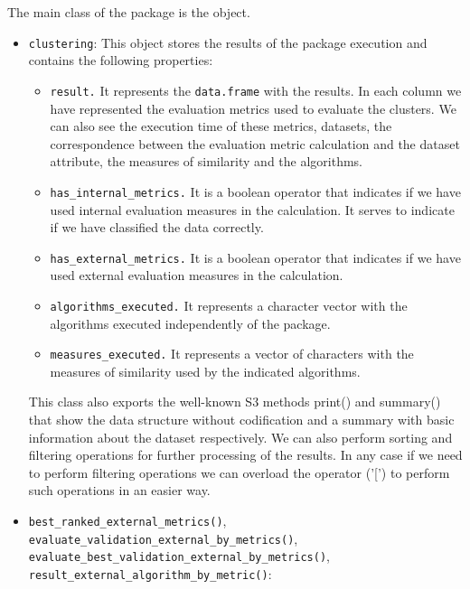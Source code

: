 The main class of the package is the  object.
\begin{itemize}
    \item \texttt{clustering}: This object stores the results of the  package execution and contains the following properties:
    \begin{itemize}
        \item \texttt{result.} It represents the \texttt{data.frame} with the results. In each column we have represented the evaluation metrics used to evaluate the clusters. We can also see the execution time of these metrics, datasets, the correspondence between the evaluation metric calculation and the dataset attribute, the measures of similarity and the algorithms.
        \item \texttt{has\_internal\_metrics.} It is a boolean operator that indicates if we have used internal evaluation measures in the calculation. It serves to indicate if we have classified the data correctly.
        \item \texttt{has\_external\_metrics.} It is a boolean operator that indicates if we have used external evaluation measures in the calculation.
        \item \texttt{algorithms\_executed.} It represents a character vector with the algorithms executed independently of the package.
        \item \texttt{measures\_executed.} It represents a vector of characters with the measures of similarity used by the indicated algorithms.
    \end{itemize}
    This class also exports the well-known S3 methods print() and summary() that show the data
structure without codification and a summary with basic information about the dataset respectively. We can also perform sorting and filtering operations for further processing of the results. In any case if we need to perform filtering operations we can overload the operator ('[') to perform such operations in an easier way.
    \item \texttt{best\_ranked\_external\_metrics()}, \texttt{evaluate\_validation\_external\_by\_metrics()},\\ \texttt{evaluate\_best\_validation\_external\_by\_metrics()},\\ \texttt{result\_external\_algorithm\_by\_metric()}:

\end{itemize}
